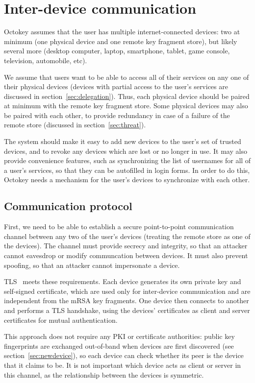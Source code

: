 \section{Inter-device communication}\label{sec:interdevice}

Octokey assumes that the user has multiple internet-connected devices: two at minimum (one physical
device and one remote key fragment store), but likely several more (desktop computer, laptop,
smartphone, tablet, game console, television, automobile, etc).

We assume that users want to be able to access all of their services on any one of their physical
devices (devices with partial access to the user's services are discussed in
section~\ref{sec:delegation}). Thus, each physical device should be paired at minimum with the
remote key fragment store. Some physical devices may also be paired with each other, to provide
redundancy in case of a failure of the remote store (discussed in section~\ref{sec:threat}).

The system should make it easy to add new devices to the user's set of trusted devices, and to
revoke any devices which are lost or no longer in use. It may also provide convenience features,
such as synchronizing the list of usernames for all of a user's services, so that they can be
autofilled in login forms. In order to do this, Octokey needs a mechanism for the user's devices to
synchronize with each other.

\subsection{Communication protocol}

First, we need to be able to establish a secure point-to-point communication channel between any two
of the user's devices (treating the remote store as one of the devices). The channel must provide
secrecy and integrity, so that an attacker cannot eavesdrop or modify communcation between devices.
It must also prevent spoofing, so that an attacker cannot impersonate a device.

TLS~\cite{TLS} meets these requirements. Each device generates its own private key and self-signed
certificate, which are used only for inter-device communication and are independent from the mRSA
key fragments. One device then connects to another and performs a TLS handshake, using the devices'
certificates as client and server certificates for mutual authentication.

This approach does not require any PKI or certificate authorities: public key fingerprints are
exchanged out-of-band when devices are first discovered (see section~\ref{sec:newdevice}), so each
device can check whether its peer is the device that it claims to be. It is not important which
device acts as client or server in this channel, as the relationship between the devices is
symmetric.

